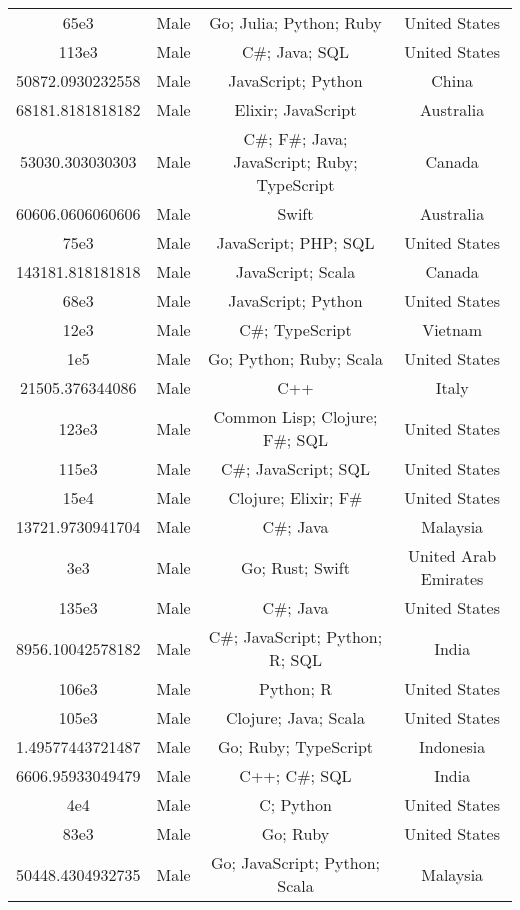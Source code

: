 \begin{center}
\begin{tabular}{ |c|c|c|c| }
65e3  &  Male  &  Go; Julia; Python; Ruby  &  United States  \\ 
113e3  &  Male  &  C\#; Java; SQL  &  United States  \\ 
50872.0930232558  &  Male  &  JavaScript; Python  &  China  \\ 
68181.8181818182  &  Male  &  Elixir; JavaScript  &  Australia  \\ 
53030.303030303  &  Male  &  C\#; F\#; Java; JavaScript; Ruby; TypeScript  &  Canada  \\ 
60606.0606060606  &  Male  &  Swift  &  Australia  \\ 
75e3  &  Male  &  JavaScript; PHP; SQL  &  United States  \\ 
143181.818181818  &  Male  &  JavaScript; Scala  &  Canada  \\ 
68e3  &  Male  &  JavaScript; Python  &  United States  \\ 
12e3  &  Male  &  C\#; TypeScript  &  Vietnam  \\ 
1e5  &  Male  &  Go; Python; Ruby; Scala  &  United States  \\ 
21505.376344086  &  Male  &  C++  &  Italy  \\ 
123e3  &  Male  &  Common Lisp; Clojure; F\#; SQL  &  United States  \\ 
115e3  &  Male  &  C\#; JavaScript; SQL  &  United States  \\ 
15e4  &  Male  &  Clojure; Elixir; F\#  &  United States  \\ 
13721.9730941704  &  Male  &  C\#; Java  &  Malaysia  \\ 
3e3  &  Male  &  Go; Rust; Swift  &  United Arab Emirates  \\ 
135e3  &  Male  &  C\#; Java  &  United States  \\ 
8956.10042578182  &  Male  &  C\#; JavaScript; Python; R; SQL  &  India  \\ 
106e3  &  Male  &  Python; R  &  United States  \\ 
105e3  &  Male  &  Clojure; Java; Scala  &  United States  \\ 
1.49577443721487  &  Male  &  Go; Ruby; TypeScript  &  Indonesia  \\ 
6606.95933049479  &  Male  &  C++; C\#; SQL  &  India  \\ 
4e4  &  Male  &  C; Python  &  United States  \\ 
83e3  &  Male  &  Go; Ruby  &  United States  \\ 
50448.4304932735  &  Male  &  Go; JavaScript; Python; Scala  &  Malaysia  \\ 

\end{tabular}
\end{center}
